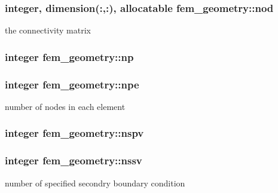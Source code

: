 \subsubsection[{nod}]{\setlength{\rightskip}{0pt plus 5cm}integer, dimension(\+:,\+:), allocatable fem\+\_\+geometry\+::nod}\label{classfem__geometry_ae04fc7c0625da6808be910120c2ba8f5}


the connectivity matrix 

\hypertarget{classfem__geometry_ab7f36fef3fec78be93a61db40f160efe}{}
\subsubsection[{np}]{\setlength{\rightskip}{0pt plus 5cm}integer fem\+\_\+geometry\+::np}\label{classfem__geometry_ab7f36fef3fec78be93a61db40f160efe}
\hypertarget{classfem__geometry_a797a070f41b998f78b389259c438b7f1}{}
\subsubsection[{npe}]{\setlength{\rightskip}{0pt plus 5cm}integer fem\+\_\+geometry\+::npe}\label{classfem__geometry_a797a070f41b998f78b389259c438b7f1}


number of nodes in each element 

\hypertarget{classfem__geometry_a3b8fb7129bee07e65960792aed717c62}{}
\subsubsection[{nspv}]{\setlength{\rightskip}{0pt plus 5cm}integer fem\+\_\+geometry\+::nspv}\label{classfem__geometry_a3b8fb7129bee07e65960792aed717c62}
\hypertarget{classfem__geometry_a8bf4a1e80679f4f0210ae0e043fca048}{}
\subsubsection[{nssv}]{\setlength{\rightskip}{0pt plus 5cm}integer fem\+\_\+geometry\+::nssv}\label{classfem__geometry_a8bf4a1e80679f4f0210ae0e043fca048}


number of specified secondry boundary condition 

